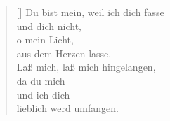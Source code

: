 \begin{multicols}{2}
\begin{verse}[\versewidth]
 Du bist mein, weil ich dich fasse\\
und dich nicht,\\
o mein Licht,\\
aus dem Herzen lasse.\\
Laß mich, laß mich hingelangen,\\
da du mich\\
und ich dich\\
lieblich werd umfangen.

\end{verse}
\end{multicols}
